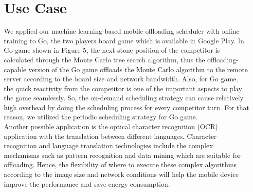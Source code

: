 \documentclass[10pt, conference, compsocconf]{IEEEtran}
\begin{document}
{\section{Use Case}
%
We applied our machine learning-based mobile offloading scheduler with
online training to Go, the two players board game which is available in
Google Play.
%
In Go game shown in Figure 5, the next stone position of the competitor
is calculated through the Monte Carlo tree search algorithm, thus the
offloading-capable version of the Go game offloads the Monte Carlo
algorithm to the remote server according to the board size and network
bandwidth.
%
Also, for Go game, the quick reactivity from the competitor is one of
the important aspects to play the game seamlessly.
%
So, the on-demand scheduling strategy can cause relatively high overhead
by doing the scheduling process for every competitor turn.
%
For that reason, we utilized the periodic scheduling strategy for Go
game.\\
%
\indent Another possible application is the optical character
recognition (OCR) application with the translation between different
languages.
%
Character recognition and language translation technologies include
the complex mechanisms such as pattern recognition and data mining which
are suitable for offloading.
%
Hence, the flexibility of where to execute these complex algorithms
according to the image size and network conditions will help the mobile
device improve the performance and save energy consumption.
%
%
}
\end{document}
